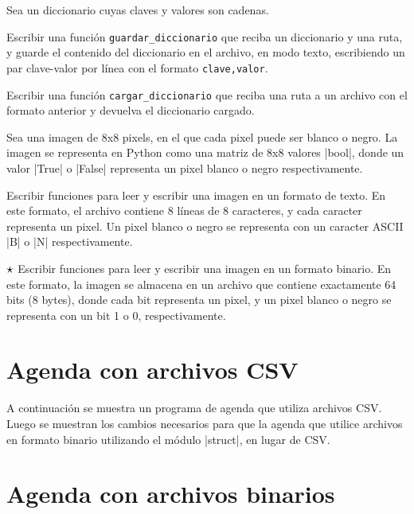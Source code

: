 \begin{ejercicio}
Sea un diccionario cuyas claves y valores son cadenas.
\begin{partes}
  \item Escribir una función \lstinline!guardar_diccionario! que reciba un diccionario
    y una ruta, y guarde el contenido del diccionario en el archivo, en modo texto,
    escribiendo un par clave-valor por línea con el formato \lstinline!clave,valor!.
  \item Escribir una función \lstinline!cargar_diccionario! que reciba una ruta a un
    archivo con el formato anterior y devuelva el diccionario cargado.
\end{partes}
\end{ejercicio}

\begin{ejercicio}
Sea una imagen de 8x8 pixels, en el que cada pixel puede ser blanco o negro.
La imagen se representa en Python como una matriz de 8x8 valores |bool|, donde un
valor |True| o |False| representa un pixel blanco o negro respectivamente.

\begin{partes}
  \item Escribir funciones para leer y escribir una imagen en un formato de texto.
    En este formato, el archivo contiene 8 líneas de 8 caracteres, y cada caracter
    representa un pixel. Un pixel blanco o negro se representa con un caracter ASCII
    |B| o |N| respectivamente.
  \item $\dificil$ Escribir funciones para leer y escribir una imagen en un formato binario.
    En este formato, la imagen se almacena en un archivo que contiene
    exactamente 64 bits (8 bytes), donde cada bit representa un pixel, y un pixel blanco
    o negro se representa con un bit 1 o 0, respectivamente.
\end{partes}
\end{ejercicio}

\newpage
\begin{subappendices}
\section{Agenda con archivos CSV}

A continuación se muestra un programa de agenda que utiliza archivos
CSV\@. Luego se muestran los cambios necesarios para que la agenda que utilice archivos
en formato binario utilizando el módulo |struct|, en lugar de CSV.



\section{Agenda con archivos binarios}



\end{subappendices}
